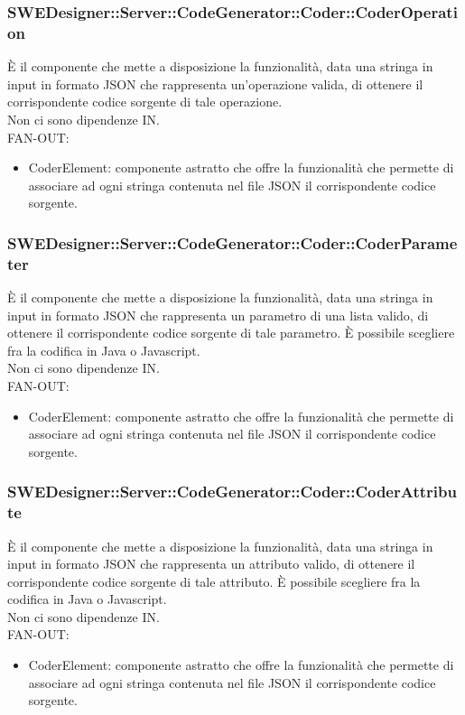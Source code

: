 \documentclass[../PianoDiQualifica.tex]{subfiles}
\begin{document}
		\subsubsection{SWEDesigner::Server::CodeGenerator::Coder::CoderOperation}
		È il componente che mette a disposizione la funzionalità, data una stringa in input in formato JSON che rappresenta un'operazione valida, di ottenere il corrispondente codice sorgente di tale operazione.\\
		Non ci sono dipendenze IN.\\
		FAN-OUT:
		\begin{itemize}
			\item CoderElement: componente astratto che offre la funzionalità che permette di associare ad ogni stringa contenuta nel file JSON il corrispondente codice sorgente.
		\end{itemize}
		\subsubsection{SWEDesigner::Server::CodeGenerator::Coder::CoderParameter}
		È il componente che mette a disposizione la funzionalità, data una stringa in input in formato JSON che rappresenta un parametro di una lista valido, di ottenere il corrispondente codice sorgente di tale parametro. È possibile scegliere fra la codifica in Java o Javascript.\\
		Non ci sono dipendenze IN.\\
		FAN-OUT:
		\begin{itemize}
			\item CoderElement: componente astratto che offre la funzionalità che permette di associare ad ogni stringa contenuta nel file JSON il corrispondente codice sorgente.
		\end{itemize}
			\subsubsection{SWEDesigner::Server::CodeGenerator::Coder::CoderAttribute}
			È il componente che mette a disposizione la funzionalità, data una stringa in input in formato JSON che rappresenta un attributo valido, di ottenere il corrispondente codice sorgente di tale attributo. È possibile scegliere fra la codifica in Java o Javascript.\\
			Non ci sono dipendenze IN.\\
			FAN-OUT:
			\begin{itemize}
				\item CoderElement: componente astratto che offre la funzionalità che permette di associare ad ogni stringa contenuta nel file JSON il corrispondente codice sorgente.
			\end{itemize}
\end{document}
